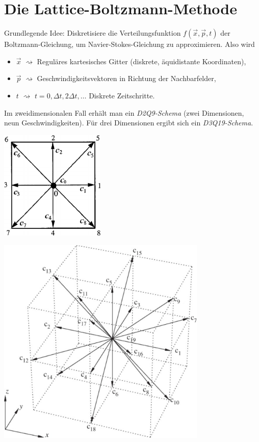 \section{Die Lattice-Boltzmann-Methode}
Grundlegende Idee: Diskretisiere die Verteilungsfunktion $f(\vec{x}, \vec{p}, t)$
der Boltzmann-Gleichung, um Navier-Stokes-Gleichung zu approximieren. Also wird
\begin{itemize}
\item $\vec{x}$ $\rightsquigarrow$ Reguläres kartesisches Gitter (diskrete,
  äquidistante Koordinaten),
\item $\vec{p}$ $\rightsquigarrow$ Geschwindigkeitsvektoren in Richtung der
  Nachbarfelder,
\item $t$ $\rightsquigarrow$ $t = 0, \Delta t, 2 \Delta t,
  \ldots$ Diskrete Zeitschritte.
\end{itemize}
Im zweidimensionalen Fall erhält man ein \emph{D2Q9-Schema} (zwei Dimensionen,
neun Geschwindigkeiten). Für drei Dimensionen ergibt sich ein
\emph{D3Q19-Schema}.
\begin{center}
  \includegraphics[width=5cm]{img/d2q9}
\end{center}
\begin{center}
  \includegraphics[width=10cm]{img/d3q19}
\end{center}

